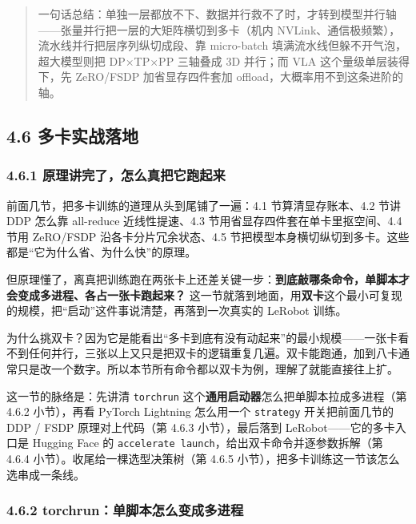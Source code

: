 \documentclass[
  chinese,
]{ctexart}
\begin{document}
\begin{quote}
一句话总结：单独一层都放不下、数据并行救不了时，才转到模型并行轴------张量并行把一层的大矩阵横切到多卡（机内
NVLink、通信极频繁），流水线并行把层序列纵切成段、靠 micro-batch
填满流水线但躲不开气泡，超大模型则把 DP×TP×PP 三轴叠成 3D 并行；而 VLA
这个量级单层装得下，先 ZeRO/FSDP 加省显存四件套加
offload，大概率用不到这条进阶的轴。
\end{quote}

\subsection{4.6
多卡实战落地}\label{ux591aux5361ux5b9eux6218ux843dux5730}

\subsubsection{4.6.1
原理讲完了，怎么真把它跑起来}\label{ux539fux7406ux8bb2ux5b8cux4e86ux600eux4e48ux771fux628aux5b83ux8dd1ux8d77ux6765}

前面几节，把多卡训练的道理从头到尾铺了一遍：4.1 节算清显存账本、4.2 节讲
DDP 怎么靠 all-reduce 近线性提速、4.3
节用省显存四件套在单卡里抠空间、4.4 节用 ZeRO/FSDP
沿各卡分片冗余状态、4.5
节把模型本身横切纵切到多卡。这些都是``它为什么省、为什么快''的原理。

但原理懂了，离真把训练跑在两张卡上还差关键一步：\textbf{到底敲哪条命令，单脚本才会变成多进程、各占一张卡跑起来？}
这一节就落到地面，用\textbf{双卡}这个最小可复现的规模，把``启动''这件事说清楚，再落到一次真实的
LeRobot 训练。

为什么挑双卡？因为它是能看出``多卡到底有没有动起来''的最小规模------一张卡看不到任何并行，三张以上又只是把双卡的逻辑重复几遍。双卡能跑通，加到八卡通常只是改一个数字。所以本节所有命令都以双卡为例，理解了就能直接往上扩。

这一节的脉络是：先讲清 \texttt{torchrun}
这个\textbf{通用启动器}怎么把单脚本拉成多进程（第 4.6.2 小节），再看
PyTorch Lightning 怎么用一个 \texttt{strategy} 开关把前面几节的 DDP /
FSDP 原理对上代码（第 4.6.3 小节），最后落到 LeRobot------它的多卡入口是
Hugging Face 的
\texttt{accelerate\ launch}，给出双卡命令并逐参数拆解（第 4.6.4
小节）。收尾给一棵选型决策树（第 4.6.5
小节），把多卡训练这一节该怎么选串成一条线。

\subsubsection{4.6.2
torchrun：单脚本怎么变成多进程}\label{torchrunux5355ux811aux672cux600eux4e48ux53d8ux6210ux591aux8fdbux7a0b}
\end{document}
